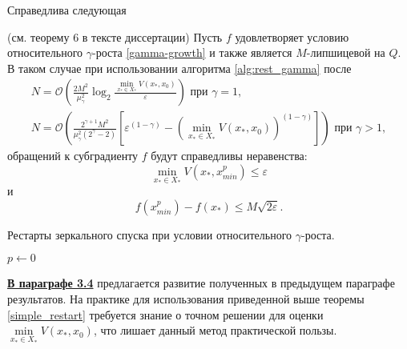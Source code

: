 Справедлива следующая 
\begin{theorem} \label{simple_restart} (см. теорему 6 в тексте диссертации)
    Пусть $f$ удовлетворяет условию относительного $\gamma$-роста \eqref{gamma-growth} и также является $M$-липшицевой на $Q$. В таком случае при использовании алгоритма \ref{alg:rest_gamma} после 
    \begin{equation}
    \begin{aligned}
       N =\mathcal{O}\left(\frac{2 M^2}{\mu_{\gamma}^2} \log_2{\frac{\min\limits_{x_* \in X_*}{V(x_*, x_0)}}{\varepsilon}}\right) \text{ при } \gamma = 1, \\
       N = \mathcal{O}\left(\frac{2^{\gamma + 1} M^2}{\mu_{\gamma}^2 (2^{\gamma} - 2)} \left[\varepsilon^{(1 - \gamma)} - \left(\min\limits_{x_* \in X_*}{V(x_*, x_0)}\right)^{(1 - \gamma)}\right]\right) \text{ при } \gamma > 1,
    \end{aligned}
    \end{equation}
    обращений к субградиенту $f$ будут справедливы неравенства:
    \begin{equation}
        \min_{x_* \in X_*}{V(x_*, x_{min}^p)} \leq \varepsilon
    \end{equation}
    и
    \begin{equation}
        f(x_{min}^p) - f(x_*) \leq M \sqrt{2 \varepsilon}.  
    \end{equation}
\end{theorem}

\begin{algorithm}[htp]
    \caption{Рестарты зеркального спуска при условии относительного $\gamma$-роста.}
    \label{alg:rest_gamma}
    $p \gets 0$\;
\end{algorithm}


\underline{\textbf{В параграфе 3.4}} предлагается развитие полученных в предыдущем параграфе результатов. На практике для использования приведенной выше теоремы \ref{simple_restart} требуется знание о точном решении для оценки $\min\limits_{x_* \in X_*}{V(x_*, x_0)}$, что лишает данный метод практической пользы. 

